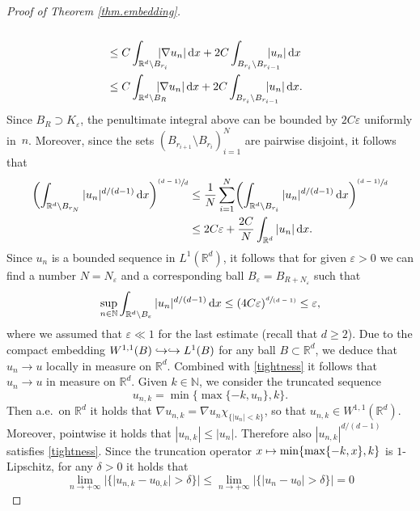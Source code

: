 \documentclass[JEP,XML,SOM,Unicode,published]{cedram}
\def\mto{\mathchoice{\longmapsto}{\mapsto}{\mapsto}{\mapsto}}
\def\hto{\mathrel{\lhook\joinrel\to}}
\newcommand{\psfrac}[2]{\sfrac{(#1)}{#2}}
\newcommand{\spfrac}[2]{\sfrac{#1}{(#2)}}
\theoremstyle{definition}
\let\e\varepsilon
\newcommand{\dx}{\,\mathrm{d}x}
\newcommand{\R}{\mathbb{R}}
\newcommand{\N}{\mathbb{N}}
\begin{document}
\begin{proof}[Proof of Theorem \ref{thm.embedding}]
\begin{align*}
\\[-3pt]
&\leq C\int_{\R^d\setminus B_{r_{i}}}\hspace*{-4mm}|\nabla u_n|\dx+2C\int_{B_{r_{i}}\setminus B_{r_{i-1}}}\hspace*{-5mm}|u_n|\dx
\\
&\leq C\int_{\R^d\setminus B_{R}}\hspace*{-4mm}|\nabla u_n|\dx+2C\int_{B_{r_{i}}\setminus B_{r_{i-1}}}\hspace*{-5mm}|u_n|\dx.
\end{align*}
Since $B_R\supset K_{\e}$, the penultimate integral above can be bounded by $2C\e$ uniformly in~$n$. Moreover, since the sets $(B_{r_{i+1}}\setminus B_{r_i})_{i=1}^N$ are pairwise disjoint, it follows that
\begin{align*}
\biggl(\int_{\R^d\setminus B_{r_N}}|u_{n}|^{d/(d-1)}\dx\biggr)^{\psfrac{d-1}{d}}&\leq \frac{1}{N}\sum_{i=1}^N \biggl(\int_{\R^d\setminus B_{r_i}}|u_{n}|^{d/(d-1)}\dx\biggr)^{\psfrac{d-1}{d}}
\\
&\leq 2C\e+\frac{2C}{N}\int_{\R^d}|u_n|\dx.
\end{align*}
Since $u_n$ is a bounded sequence in $L^1(\R^d)$, it follows that for given $\e>0$ we can find a number $N=N_{\e}$ and a corresponding ball $B_{\e}=B_{R+N_{\e}}$ such that
\begin{equation}\label{tightness}
\sup_{n\in\N}\int_{\R^d\setminus B_{\e}}|u_n|^{d/(d-1)}\dx\leq (4C\e)^{\spfrac{d}{d-1}}\leq \e,
\end{equation}
where we assumed that $\e\ll 1$ for the last estimate (recall that $d\geq 2$). Due to the compact embedding $W^{1,1}(B)\hto\hto L^1(B)$ for any ball $B\subset\R^d$, we deduce that $u_n\to u$ locally in measure on $\R^d$. Combined with \eqref{tightness} it follows that $u_n\to u$ in measure on $\R^d$. Given $k\in\N$, we consider the truncated sequence\vspace*{-3pt}
\begin{equation*}
u_{n,k}=\min\{\max\{-k,u_n\},k\}.
\end{equation*}
Then a.e.\ on $\R^d$ it holds that $\nabla u_{n,k}=\nabla u_n\chi_{\{|u_n|< k\}}$, so that $u_{n,k}\in W^{1,1}(\R^d)$. Moreover, pointwise it holds that $|u_{n,k}|\leq |u_n|$. Therefore also $|u_{n,k}|^{d/(d-1)}$ satisfies \eqref{tightness}. Since the truncation operator $x\mto \min\{\max\{-k,x\},k\}$ is $1$-Lipschitz, for any $\delta>0$ it holds that\vspace*{-3pt}
\begin{equation*}
\lim_{n\to +\infty}|\{|u_{n,k}-u_{0,k}|>\delta\}|\leq \lim_{n\to +\infty}|\{|u_n-u_0|>\delta\}|=0

\end{equation*}
\end{proof}
\end{document}
